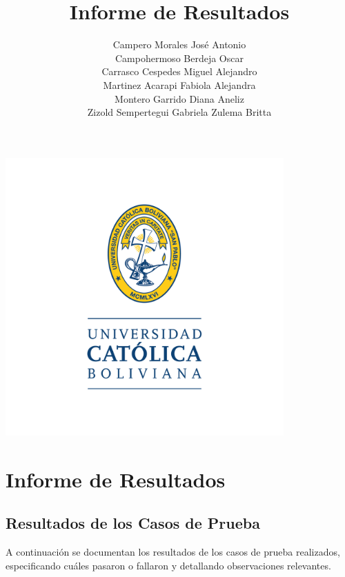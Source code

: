 \documentclass[stu, 12pt, letterpaper, donotrepeattitle, floatsintext, natbib]{apa7}
\title{\Large Informe de Resultados }
\author{
    Campero Morales José Antonio \\
    Campohermoso Berdeja Oscar \\
    Carrasco Cespedes Miguel Alejandro \\
    Martinez Acarapi Fabiola Alejandra \\
    Montero Garrido Diana Aneliz \\
    Zizold Sempertegui Gabriela Zulema Britta
}
\affiliation{Universidad Católica Boliviana}
\begin{document}
\thispagestyle{empty}

\centering
\includegraphics[width=0.8\textwidth]{../imgs/logo-ucb.png} %
\vspace{-5cm} %

\maketitle

\newpage
{}
\renewcommand\contentsname{\large Índice}
\tableofcontents
\setcounter{tocdepth}{2}
\newpage
\renewcommand{\listfigurename}{\large Índice de figuras}
\listoffigures
\newpage
\renewcommand{\listtablename}{\large Índice de tablas}
\listoftables
\newpage

\newpage
\section{\large Informe de Resultados}

\subsection{Resultados de los Casos de Prueba}

\noindent A continuación se documentan los resultados de los casos de prueba realizados, especificando cuáles pasaron o fallaron y detallando observaciones relevantes.
\end{document}
